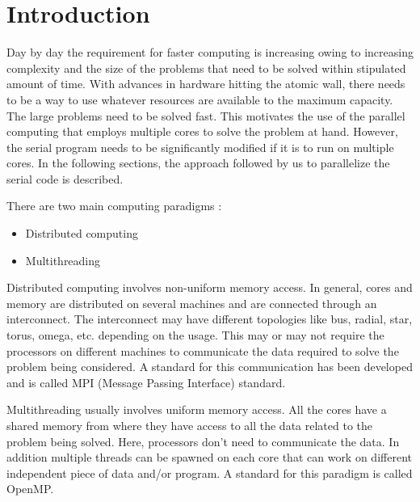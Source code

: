 \documentclass[a4paper, 11pt, oneside]{scrartcl}
\begin{document}




\section{Introduction}

\nocite{pp1}
Day by day the requirement for faster computing is increasing owing to increasing complexity and the size of the problems that need to be solved within stipulated amount of time. With advances in hardware hitting the atomic wall, there needs to be a way to use whatever resources are available to the maximum capacity. The large problems need to be solved fast. This motivates the use of the parallel computing that employs multiple cores to solve the problem at hand. However, the serial program needs to be significantly modified if it is to run on multiple cores. In the following sections, the approach followed by us to parallelize the serial code is described.

There are two main computing paradigms \cite{pp1}:
\begin{itemize}
\item Distributed computing
\item Multithreading
\end{itemize}

Distributed computing involves non-uniform memory access. In general, cores and memory are distributed on several machines and are connected through an interconnect. The interconnect may have different topologies like bus, radial, star, torus, omega, etc. depending on the usage. This may or may not require the processors on different machines to communicate the data required to solve the problem being considered. A standard for this communication has been developed and is called MPI (Message Passing Interface) standard.

Multithreading usually involves uniform memory access. All the cores have a shared memory from where they have access to all the data related to the problem being solved. Here, processors don't need to communicate the data. In addition multiple threads can be spawned on each core that can work on different independent piece of data and/or program. A standard for this paradigm is called OpenMP. 
\end{document}
